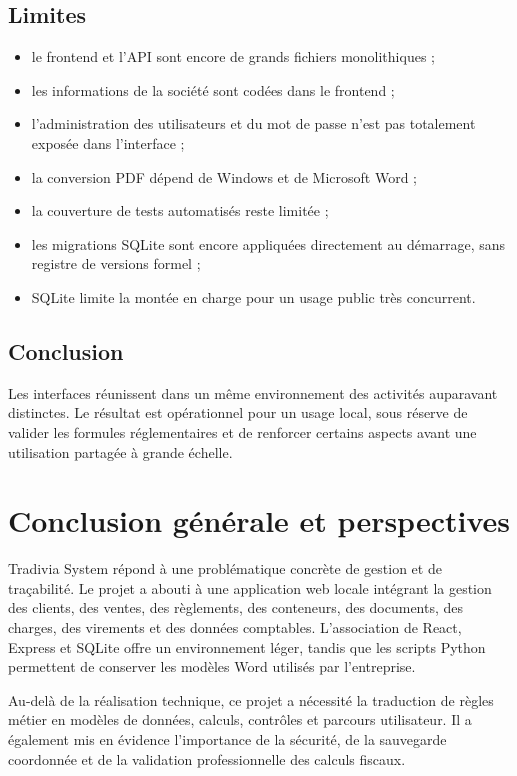\documentclass[12pt,a4paper,oneside]{report}
\begin{document}
\section{Limites}
\begin{itemize}
  \item le frontend et l'API sont encore de grands fichiers monolithiques ;
  \item les informations de la société sont codées dans le frontend ;
  \item l'administration des utilisateurs et du mot de passe n'est pas totalement exposée dans l'interface ;
  \item la conversion PDF dépend de Windows et de Microsoft Word ;
  \item la couverture de tests automatisés reste limitée ;
  \item les migrations SQLite sont encore appliquées directement au démarrage, sans registre de versions formel ;
  \item SQLite limite la montée en charge pour un usage public très concurrent.
\end{itemize}

\section*{Conclusion}
Les interfaces réunissent dans un même environnement des activités auparavant distinctes. Le résultat est opérationnel pour un usage local, sous réserve de valider les formules réglementaires et de renforcer certains aspects avant une utilisation partagée à grande échelle.

\chapter*{Conclusion générale et perspectives}
Tradivia System répond à une problématique concrète de gestion et de traçabilité. Le projet a abouti à une application web locale intégrant la gestion des clients, des ventes, des règlements, des conteneurs, des documents, des charges, des virements et des données comptables. L'association de React, Express et SQLite offre un environnement léger, tandis que les scripts Python permettent de conserver les modèles Word utilisés par l'entreprise.

Au-delà de la réalisation technique, ce projet a nécessité la traduction de règles métier en modèles de données, calculs, contrôles et parcours utilisateur. Il a également mis en évidence l'importance de la sécurité, de la sauvegarde coordonnée et de la validation professionnelle des calculs fiscaux.
\end{document}
